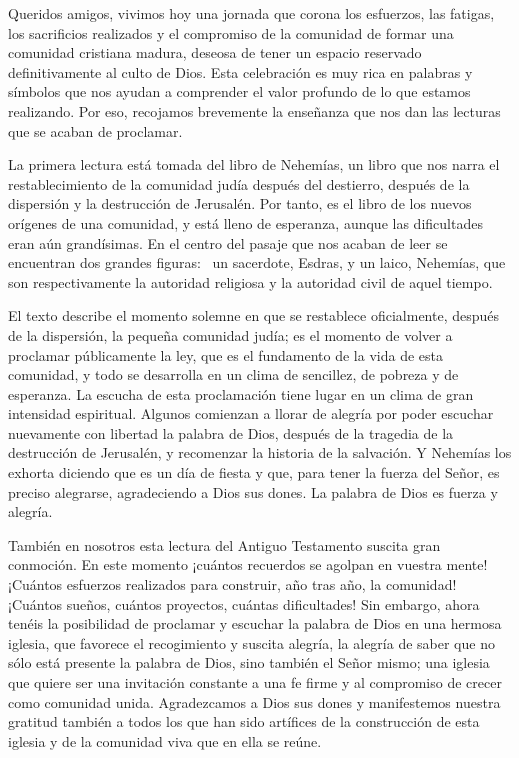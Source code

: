 Queridos amigos, vivimos hoy una jornada que corona los esfuerzos, las fatigas, los sacrificios realizados y el compromiso de la comunidad de formar una comunidad cristiana madura, deseosa de tener un espacio reservado definitivamente al culto de Dios. Esta celebración es muy rica en palabras y símbolos que nos ayudan a comprender el valor profundo de lo que estamos realizando. Por eso, recojamos brevemente la enseñanza que nos dan las lecturas que se acaban de proclamar.

La primera lectura está tomada del libro de Nehemías, un libro que nos narra el restablecimiento de la comunidad judía después del destierro, después de la dispersión y la destrucción de Jerusalén. Por tanto, es el libro de los nuevos orígenes de una comunidad, y está lleno de esperanza, aunque las dificultades eran aún grandísimas. En el centro del pasaje que nos acaban de leer se encuentran dos grandes figuras:~ un sacerdote, Esdras, y un laico, Nehemías, que son respectivamente la autoridad religiosa y la autoridad civil de aquel tiempo.

El texto describe el momento solemne en que se restablece oficialmente, después de la dispersión, la pequeña comunidad judía; es el momento de volver a proclamar públicamente la ley, que es el fundamento de la vida de esta comunidad, y todo se desarrolla en un clima de sencillez, de pobreza y de esperanza. La escucha de esta proclamación tiene lugar en un clima de gran intensidad espiritual. Algunos comienzan a llorar de alegría por poder escuchar nuevamente con libertad la palabra de Dios, después de la tragedia de la destrucción de Jerusalén, y recomenzar la historia de la salvación. Y Nehemías los exhorta diciendo que es un día de fiesta y que, para tener la fuerza del Señor, es preciso alegrarse, agradeciendo a Dios sus dones. La palabra de Dios es fuerza y alegría.

También en nosotros esta lectura del Antiguo Testamento suscita gran conmoción. En este momento ¡cuántos recuerdos se agolpan en vuestra mente! ¡Cuántos esfuerzos realizados para construir, año tras año, la comunidad! ¡Cuántos sueños, cuántos proyectos, cuántas dificultades! Sin embargo, ahora tenéis la posibilidad de proclamar y escuchar la palabra de Dios en una hermosa iglesia, que favorece el recogimiento y suscita alegría, la alegría de saber que no sólo está presente la palabra de Dios, sino también el Señor mismo; una iglesia que quiere ser una invitación constante a una fe firme y al compromiso de crecer como comunidad unida. Agradezcamos a Dios sus dones y manifestemos nuestra gratitud también a todos los que han sido artífices de la construcción de esta iglesia y de la comunidad viva que en ella se reúne.

